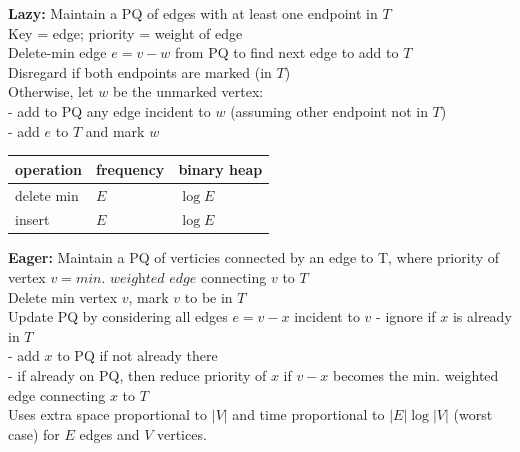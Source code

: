 \documentclass[letterpaper, 8pt]{extarticle}
\begin{document}
\begin{multicols*}{5}
  \textbf{Lazy:} Maintain a PQ of edges with at least one endpoint in $T$ \\
  Key = edge; priority = weight of edge \\
  Delete-min edge $e = v - w$ from PQ to find next edge to add to $T$ \\
  Disregard if both endpoints are marked (in $T$) \\
  Otherwise, let $w$ be the unmarked vertex: \\
  - add to PQ any edge incident to $w$ (assuming other endpoint not in $T$) \\
  - add $e$ to $T$ and mark $w$ \\
  \begin{tabulary}{\linewidth}{@{}LLL@{}} \toprule
    operation  & frequency & binary heap \\ \midrule
    delete min & $E$       & $\log E$    \\
    insert     & $E$       & $\log E$    \\ \bottomrule
  \end{tabulary}

  \textbf{Eager:} Maintain a PQ of verticies connected by an edge to T,
  where priority of vertex $v = \textit{min. weighted edge}$ connecting $v$ to $T$ \\
  Delete min vertex $v$, mark $v$ to be in $T$ \\
  Update PQ by considering all edges $e = v-x$ incident to $v$
  - ignore if $x$ is already in $T$ \\
  - add $x$ to PQ if not already there \\
  - if already on PQ, then reduce priority of $x$ if $v-x$ becomes the min. weighted edge connecting $x$ to $T$ \\
  Uses extra space proportional to $|V|$ and time proportional to $|E| \log |V|$ (worst case)
  for $E$ edges and $V$ vertices.

\end{multicols*}
\end{document}
